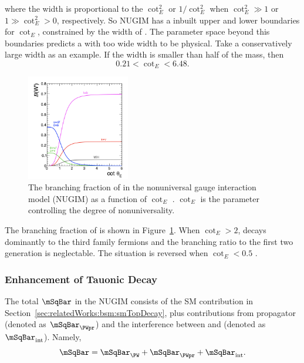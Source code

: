\noindent where the width is proportional to the $ \cot^2_E $ or $ 1/\cot^2_E$ when $\cot^2_E \gg 1$ or $1 \gg \cot^2_E > 0$, respectively.  So NUGIM has a inbuilt upper and lower boundaries for $\cot_E$, constrained by the width of \PWpr. The parameter space beyond this boundaries predicts a \PWpr with too wide width to be physical.  Take a conservatively large width as an example. If the width is smaller than half of the \PWpr mass, then 
\begin{equation}
    0.21 < \cot_E < 6.48.
\end{equation}


\begin{figure}[ht]
    \centering
    \includegraphics[width=0.4\textwidth]{chapters/RelatedWorks/sectionBSM/figures/WPDecayBr.png}
    \caption{The branching fraction of \PWpr in the nonuniversal gauge interaction model (NUGIM) as a function of $\cot_E$ \cite{Sirunyan:2018lbg}. $\cot_E$ is the parameter controlling the degree of nonuniversality.}
    \label{fig:relatedWorks:bsm:WPrime:braching}
\end{figure}



\noindent The branching fraction of \PWpr is shown in Figure~\ref{fig:relatedWorks:bsm:WPrime:braching}. When $\cot_E > 2$, \PWpr decays dominantly to the third family fermions and the branching ratio to the first two generation is neglectable. The situation is reversed when $\cot_E<0.5$ .


\subsubsection{Enhancement of Tauonic Decay}

The total $\mSqBar$ in the NUGIM consists of the SM contribution in Section~\ref{sec:relatedWorks:bsm:smTopDecay}, plus contributions from \PWpr propagator (denoted as $\mSqBar _{\PWpr} $) and the interference between \PW and \PWpr (denoted as $\mSqBar_{\mathrm{int}} $). Namely,
\begin{equation}
	\mSqBar  = \mSqBar _{\PW} +  \mSqBar _{\PWpr} +  \mSqBar _{\mathrm{int}} .
\end{equation}

